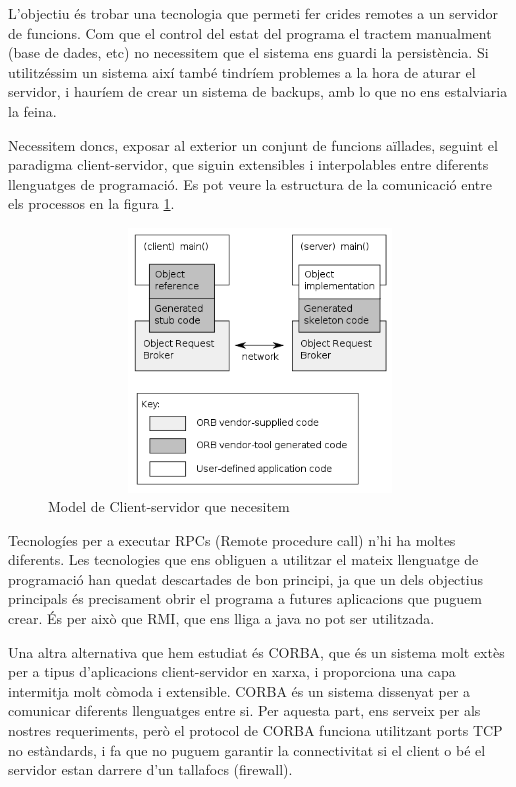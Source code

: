 L'objectiu és trobar una tecnologia que permeti fer crides remotes a un servidor
de funcions.  Com que el control del estat del programa el tractem manualment
(base de dades, etc) no necessitem que el sistema ens guardi la persistència.
Si utilitzéssim un sistema així també tindríem problemes a la hora de aturar el
servidor, i hauríem de crear un sistema de backups, amb lo que no ens
estalviaria la feina.

Necessitem doncs, exposar al exterior un conjunt de funcions aïllades, seguint el
paradigma client-servidor, que siguin extensibles i interpolables entre
diferents llenguatges de programació. Es pot veure la estructura de la
comunicació entre els processos en la figura \ref{fig:401px-Orb.png}.

\begin{figure}[h]
\centering
\includegraphics[width=13cm,height=7cm]{401px-Orb.png}
\caption{Model de Client-servidor que necesitem}
\label{fig:401px-Orb.png}
\end{figure} 

Tecnologíes per a executar RPCs (Remote procedure call) n'hi ha moltes
diferents. Les tecnologies que ens obliguen a utilitzar el mateix llenguatge de
programació han quedat descartades de bon principi, ja que un dels objectius
principals és precisament obrir el programa a futures aplicacions que puguem
crear.  És per això que RMI, que ens lliga a java no pot ser utilitzada.  

Una altra alternativa que hem estudiat és CORBA, que és un sistema molt extès
per a tipus d'aplicacions client-servidor en xarxa, i proporciona una capa
intermitja molt còmoda i extensible.  CORBA és un sistema dissenyat per a
comunicar diferents llenguatges entre si.  Per aquesta part, ens serveix per als
nostres requeriments, però el protocol de CORBA funciona utilitzant ports TCP
no estàndards, i fa que no puguem garantir la connectivitat si el client o bé el
servidor estan darrere d'un tallafocs (firewall).

